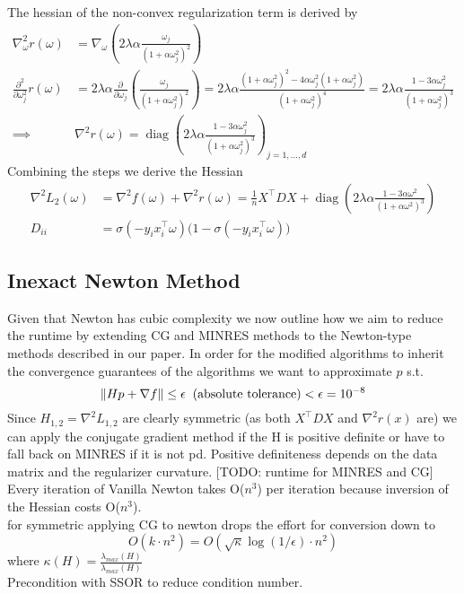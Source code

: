 \documentclass{article}
\begin{document}
%
The hessian of the non-convex regularization term is derived by
\begin{align*}
\nabla ^2 _\omega r(\omega) &= \nabla _\omega \left(2 \lambda \alpha \frac{\omega_j}{(1 + \alpha \omega_j^2)^2} \right)\\
%
\frac{\partial^2}{\partial \omega_j^2} r(\omega) 
&= 2 \lambda \alpha \frac{\partial}{\partial \omega_j} \left( \frac{\omega_j}{(1 + \alpha \omega_j^2)^2} \right)
= 2 \lambda \alpha \frac{(1 + \alpha \omega_j^2)^2 - 4 \alpha \omega_j^2 (1 + \alpha \omega_j^2)}{(1 + \alpha \omega_j^2)^4}
= 2 \lambda \alpha \frac{1 - 3 \alpha \omega_j^2}{(1 + \alpha \omega_j^2)^3} \\
\implies & \nabla^2 r(\omega) = \operatorname{diag}\left(2 \lambda \alpha \frac{1 - 3 \alpha \omega_j^2}{(1 + \alpha \omega_j^2)^3}\right)_{j=1,\ldots,d}
\end{align*}
Combining the steps we derive the Hessian
\begin{align*}
\nabla^2 L_2(\omega) &= \nabla^2 f(\omega) + \nabla^2 r(\omega)
= \frac{1}{n} X^\top D X + \operatorname{diag}\left(2 \lambda \alpha \frac{1 - 3 \alpha \omega^2}{(1 + \alpha \omega^2)^3}\right) \\
D_{ii} &= \sigma(-y_i x_i^\top \omega) \big(1 - \sigma(-y_i x_i^\top \omega)\big)
\end{align*}



\subsection{Inexact Newton Method}
Given that Newton has cubic complexity we now outline how we aim to reduce the runtime by extending CG and MINRES methods to the Newton-type methods described in our paper. In order for the modified algorithms to inherit the convergence guarantees of the algorithms we want to approximate $p$ s.t.
$$ \| H p + \nabla f \| \leq \epsilon \hspace{0.2cm} \text{(absolute tolerance)} < \epsilon = 10^{-8} $$
Since $H_{1,2} = \nabla ^2 L_{1,2}$ are clearly symmetric (as both $X^\top D X$ and $\nabla ^2 r(x)$ are) we can apply the conjugate gradient method 
if the H is positive definite or have to fall back on MINRES if it is not pd. Positive definiteness depends on the data matrix and the regularizer curvature.
[TODO: runtime for MINRES and CG]\\
Every iteration of Vanilla Newton takes O($n^3$) per iteration because inversion of the Hessian costs O($n^3$).\\
for symmetric applying CG to newton drops the effort for conversion down to 
$$O(k\cdot n^2) = O(\sqrt{\kappa}\log \left( 1/\epsilon\right) \cdot n^2)$$ where $\kappa(H) = \frac{\lambda_{max}(H)}{\lambda_{max}(H)}$\\
Precondition with SSOR to reduce condition number.


\end{document}
